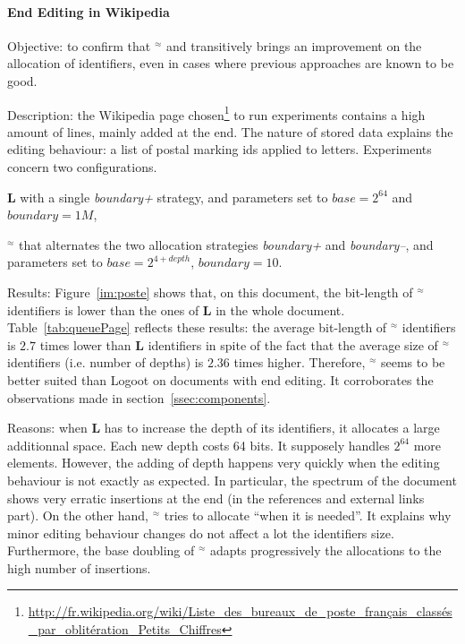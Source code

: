 \paragraph{End Editing in Wikipedia}
\begin{asparadesc}
  
\item[Objective:] to confirm that \textbf{\NAME{}}$^\approx$ and transitively
  \NAME{} brings an improvement on the allocation of identifiers, even in cases
  where previous approaches are known to be good.

\item[Description:] the Wikipedia page
  chosen\footnote{\url{http://fr.wikipedia.org/wiki/Liste_des_bureaux_de_poste_français_classés_par_oblitération_Petits_Chiffres}}
  to run experiments contains a high amount of lines, mainly added at the
  end. The nature of stored data explains the editing behaviour: a list of
  postal marking ids applied to letters. Experiments concern two
  configurations.
  \begin{inparaenum}[(1)]
  \item \textbf{L} with a single \emph{boundary+} strategy, and parameters set
    to $base=2^{64}$ and $boundary=1M$,
  \item \textbf{\NAME{}}$^\approx$ that alternates the two allocation
    strategies \emph{boundary+} and \emph{boundary--}, and parameters set to
    $base=2^{4+depth}$, $boundary=10$.
  \end{inparaenum}

\item[Results:] Figure~\ref{im:poste} shows that, on this document, the
  bit-length of \textbf{\NAME{}}$^\approx$ identifiers is lower than the ones
  of \textbf{L} in the whole document. Table~\ref{tab:queuePage} reflects these
  results: the average bit-length of \textbf{\NAME{}}$^\approx$ identifiers is
  $2.7$ times lower than \textbf{L} identifiers in spite of the fact that the
  average size of \textbf{\NAME{}}$^\approx$ identifiers (i.e. number of
  depths) is $2.36$ times higher. Therefore, \textbf{\NAME{}}$^\approx$ seems
  to be better suited than Logoot on documents with end editing. It
  corroborates the observations made in section~\ref{ssec:components}.

\item[Reasons:] when \textbf{L} has to increase the depth of its identifiers,
  it allocates a large additionnal space. Each new depth costs 64 bits. It
  supposely handles $2^64$ more elements. However, the adding of depth happens
  very quickly when the editing behaviour is not exactly as expected. In
  particular, the spectrum of the document shows very erratic insertions at the
  end (in the references and external links part). On the other hand,
  \textbf{\NAME{}}$^\approx$ tries to allocate ``when it is needed''. It
  explains why minor editing behaviour changes do not affect a lot the
  identifiers size. Furthermore, the base doubling of
  \textbf{\NAME{}}$^\approx$ adapts progressively the allocations to the high
  number of insertions.
\end{asparadesc}
 
